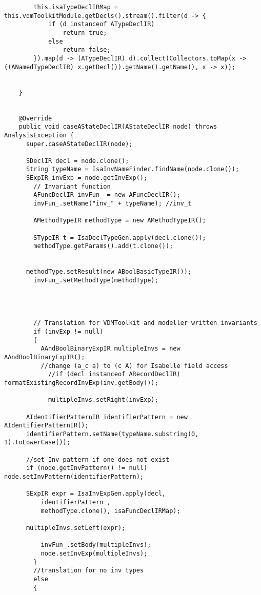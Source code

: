 \begin{appendices}
\begin{lstlisting}
        this.isaTypeDeclIRMap = this.vdmToolkitModule.getDecls().stream().filter(d -> {
            if (d instanceof ATypeDeclIR)
                return true;
            else
                return false;
        }).map(d -> (ATypeDeclIR) d).collect(Collectors.toMap(x -> ((ANamedTypeDeclIR) x.getDecl()).getName().getName(), x -> x));


    }

    
    @Override
    public void caseAStateDeclIR(AStateDeclIR node) throws AnalysisException {
      super.caseAStateDeclIR(node);
      
      SDeclIR decl = node.clone();
      String typeName = IsaInvNameFinder.findName(node.clone());
      SExpIR invExp = node.getInvExp();
        // Invariant function
        AFuncDeclIR invFun_ = new AFuncDeclIR();
        invFun_.setName("inv_" + typeName); //inv_t

        AMethodTypeIR methodType = new AMethodTypeIR();
        
        STypeIR t = IsaDeclTypeGen.apply(decl.clone());
        methodType.getParams().add(t.clone());
        
          
      methodType.setResult(new ABoolBasicTypeIR());
        invFun_.setMethodType(methodType);
         
          
          
  
        // Translation for VDMToolkit and modeller written invariants
        if (invExp != null)
        {
          AAndBoolBinaryExpIR multipleInvs = new AAndBoolBinaryExpIR();
          //change (a_c a) to (c A) for Isabelle field access
            //if (decl instanceof ARecordDeclIR) formatExistingRecordInvExp(inv.getBody());
          
            multipleInvs.setRight(invExp);
          
      AIdentifierPatternIR identifierPattern = new AIdentifierPatternIR();
      identifierPattern.setName(typeName.substring(0, 1).toLowerCase());
      
      //set Inv pattern if one does not exist
      if (node.getInvPattern() != null) node.setInvPattern(identifierPattern);
      
      SExpIR expr = IsaInvExpGen.apply(decl, 
          identifierPattern , 
          methodType.clone(), isaFuncDeclIRMap);
          
      multipleInvs.setLeft(expr);
          
          invFun_.setBody(multipleInvs);
          node.setInvExp(multipleInvs);
        } 
        //translation for no inv types 
        else 
        {
        

\end{lstlisting}
\end{appendices}
